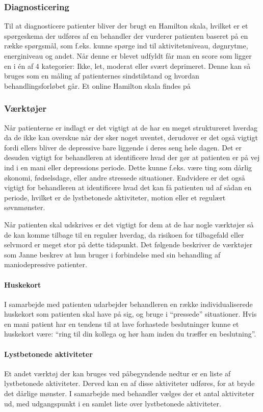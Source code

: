\subsubsection{Diagnosticering}
Til at diagnosticere patienter bliver der brugt en Hamilton skala, hvilket er et spørgeskema der udføres af en behandler der vurderer patienten baseret på en række spørgsmål, som f.eks. kunne spørge ind til aktivitetsniveau, døgnrytme, energiniveau og andet.
Når denne er blevet udfyldt får man en score som ligger en i én af 4 kategorier: Ikke, let, moderat eller svært deprimeret. 
Denne kan så bruges som en måling af patienternes sindstilstand og hvordan behandlingsforløbet går.
Et online Hamilton skala findes på \citet{hamilton}


\subsubsection{Værktøjer}
Når patienterne er indlagt er det vigtigt at de har en meget struktureret hverdag da de ikke kan overskue når der sker noget uventet, derudover er det også vigtigt fordi ellers bliver de depressive bare liggende i deres seng hele dagen.
Det er desuden vigtigt for behandleren at identificere hvad der gør at patienten er på vej ind i en mani eller depressions periode.
Dette kunne f.eks. være ting som dårlig økonomi, fødselsdage, eller andre stressede situationer.
Endvidere er det også vigtigt for behandleren at identificere hvad det kan få patienten ud af sådan en periode, hvilket er de lystbetonede aktiviteter, motion eller et regulært søvnmønster.

Når patienten skal udskrives er det vigtigt for dem at de har nogle værktøjer så de kan komme tilbage til en regulær hverdag, da risikoen for tilbagefald eller selvmord er meget stor på dette tidspunkt. 
Det følgende beskriver de værktøjer som Janne beskrev at hun bruger i forbindelse med sin behandling af maniodepressive patienter.

\paragraph{Huskekort}
I samarbejde med patienten udarbejder behandleren en række individualiserede huskekort som patienten skal have på sig, og bruge i ``pressede'' situationer. 
Hvis en mani patient har en tendens til at lave forhastede beslutninger kunne et huskekort være: ``ring til din kollega og hør ham inden du træffer en beslutning''.

\paragraph{Lystbetonede aktiviteter}
Et andet værktøj der kan bruges ved påbegyndende nedtur er en liste af lystbetonede aktiviteter.
Derved kan en af disse aktiviteter udføres, for at bryde det dårlige mønster.
I samarbejde med behandler vælges der et antal aktiviteter ud, med udgangspunkt i en samlet liste over lystbetonede aktiviteter.

